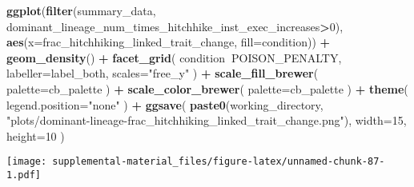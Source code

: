 \documentclass[]{book}
\newenvironment{Shaded}{\begin{snugshade}}{\end{snugshade}}
\newcommand{\DataTypeTok}[1]{\textcolor[rgb]{0.13,0.29,0.53}{#1}}
\newcommand{\DecValTok}[1]{\textcolor[rgb]{0.00,0.00,0.81}{#1}}
\newcommand{\KeywordTok}[1]{\textcolor[rgb]{0.13,0.29,0.53}{\textbf{#1}}}
\newcommand{\NormalTok}[1]{#1}
\newcommand{\OperatorTok}[1]{\textcolor[rgb]{0.81,0.36,0.00}{\textbf{#1}}}
\newcommand{\StringTok}[1]{\textcolor[rgb]{0.31,0.60,0.02}{#1}}
\begin{document}
\begin{Shaded}
\begin{Highlighting}[]
\KeywordTok{ggplot}\NormalTok{(}\KeywordTok{filter}\NormalTok{(summary_data, dominant_lineage_num_times_hitchhike_inst_exec_increases}\OperatorTok{>}\DecValTok{0}\NormalTok{), }\KeywordTok{aes}\NormalTok{(}\DataTypeTok{x=}\NormalTok{frac_hitchhiking_linked_trait_change, }\DataTypeTok{fill=}\NormalTok{condition)) }\OperatorTok{+}
\StringTok{  }\KeywordTok{geom_density}\NormalTok{() }\OperatorTok{+}
\StringTok{  }\KeywordTok{facet_grid}\NormalTok{(}
\NormalTok{    condition}\OperatorTok{~}\NormalTok{POISON_PENALTY,}
    \DataTypeTok{labeller=}\NormalTok{label_both,}
    \DataTypeTok{scales=}\StringTok{"free_y"}
\NormalTok{  ) }\OperatorTok{+}
\StringTok{  }\KeywordTok{scale_fill_brewer}\NormalTok{(}
    \DataTypeTok{palette=}\NormalTok{cb_palette}
\NormalTok{  ) }\OperatorTok{+}
\StringTok{  }\KeywordTok{scale_color_brewer}\NormalTok{(}
    \DataTypeTok{palette=}\NormalTok{cb_palette}
\NormalTok{  ) }\OperatorTok{+}
\StringTok{  }\KeywordTok{theme}\NormalTok{(}
    \DataTypeTok{legend.position=}\StringTok{"none"}
\NormalTok{  ) }\OperatorTok{+}
\StringTok{  }\KeywordTok{ggsave}\NormalTok{(}
    \KeywordTok{paste0}\NormalTok{(working_directory, }\StringTok{"plots/dominant-lineage-frac_hitchhiking_linked_trait_change.png"}\NormalTok{),}
    \DataTypeTok{width=}\DecValTok{15}\NormalTok{,}
    \DataTypeTok{height=}\DecValTok{10}
\NormalTok{  )}
\end{Highlighting}
\end{Shaded}

\texttt{[image: supplemental-material\_files/figure-latex/unnamed-chunk-87-1.pdf]}
\end{document}
